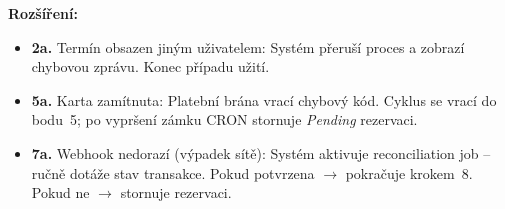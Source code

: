 \documentclass[11pt, a4paper]{article}
\begin{document}
\textbf{Rozšíření:}
\begin{itemize}
  \item \textbf{2a.} Termín obsazen jiným uživatelem: Systém přeruší proces a zobrazí chybovou zprávu. Konec případu užití.
  \item \textbf{5a.} Karta zamítnuta: Platební brána vrací chybový kód. Cyklus se vrací do bodu~5; po vypršení zámku CRON stornuje \textit{Pending} rezervaci.
  \item \textbf{7a.} Webhook nedorazí (výpadek sítě): Systém aktivuje reconciliation job -- ručně dotáže stav transakce. Pokud potvrzena $\rightarrow$ pokračuje krokem~8. Pokud ne $\rightarrow$ stornuje rezervaci.
\end{itemize}
\end{document}
